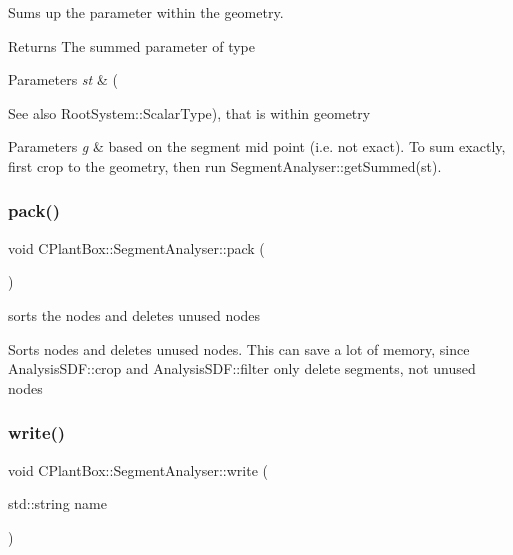 Sums up the parameter within the geometry. 

\begin{DoxyReturn}{Returns}
The summed parameter of type 
\end{DoxyReturn}

\begin{DoxyParams}{Parameters}
{\em st} & (\\
\hline
\end{DoxyParams}
\begin{DoxySeeAlso}{See also}
Root\+System\+::\+Scalar\+Type), that is within geometry 
\end{DoxySeeAlso}

\begin{DoxyParams}{Parameters}
{\em g} & based on the segment mid point (i.\+e. not exact). To sum exactly, first crop to the geometry, then run Segment\+Analyser\+::get\+Summed(st). \\
\hline
\end{DoxyParams}
\mbox{\label{classCPlantBox_1_1SegmentAnalyser_a488c906a2b685e6e50d990c2bb617607}} 
\subsubsection{\texorpdfstring{pack()}{pack()}}
{\footnotesize\ttfamily void C\+Plant\+Box\+::\+Segment\+Analyser\+::pack (\begin{DoxyParamCaption}{ }\end{DoxyParamCaption})}



sorts the nodes and deletes unused nodes 

Sorts nodes and deletes unused nodes. This can save a lot of memory, since Analysis\+S\+D\+F\+::crop and Analysis\+S\+D\+F\+::filter only delete segments, not unused nodes \mbox{\label{classCPlantBox_1_1SegmentAnalyser_a2d01686f47050ae3362d61d34390fd4b}} 
\subsubsection{\texorpdfstring{write()}{write()}}
{\footnotesize\ttfamily void C\+Plant\+Box\+::\+Segment\+Analyser\+::write (\begin{DoxyParamCaption}\item[{std\+::string}]{name }\end{DoxyParamCaption})}



